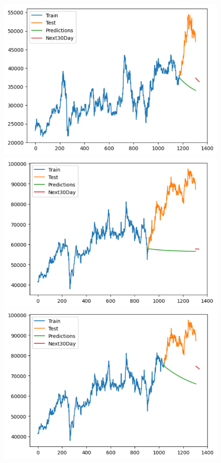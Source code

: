 \begin{figure}[H]
\begin{minipage}{0.15\textwidth}
    \centering
    \includegraphics[width=1\textwidth]{resources/chapter-5/newdata/result/BIDV_VARMA_9-1.png}
    \end{minipage}
    \hfill
    \begin{minipage}{0.15\textwidth}
    \centering
    \includegraphics[width=1\textwidth]{resources/chapter-5/newdata/result/VCB_VARMA_7-3.png}
    \end{minipage}
    \hfill
    \begin{minipage}{0.15\textwidth}
    \centering
    \includegraphics[width=1\textwidth]{resources/chapter-5/newdata/result/VCB_VARMA_8-2.png}

\end{minipage}
\end{figure}
